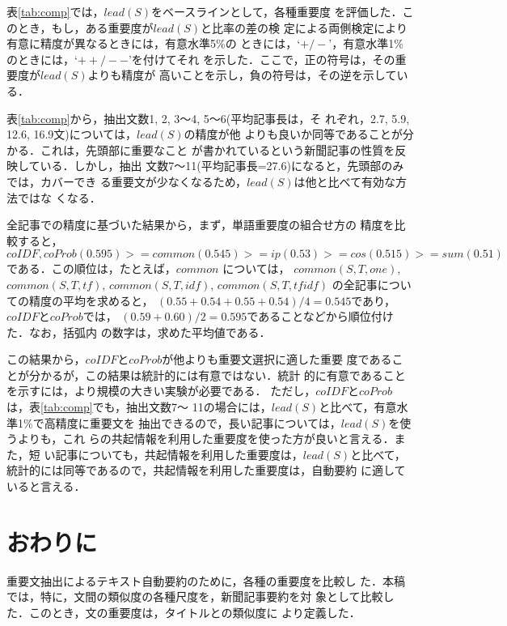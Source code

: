 表\ref{tab:comp}では，$lead(S)$をベースラインとして，各種重要度
を評価した．このとき，もし，ある重要度が$lead(S)$と比率の差の検
定による両側検定により有意に精度が異なるときには，有意水準5\%の
ときには，`$+/-$'，有意水準1\%のときには，`$++/--$'を付けてそれ
を示した．ここで，正の符号は，その重要度が$lead(S)$よりも精度が
高いことを示し，負の符号は，その逆を示している．

表\ref{tab:comp}から，抽出文数1, 2, 3〜4, 5〜6(平均記事長は，そ
れぞれ，2.7, 5.9, 12.6, 16.9文)については，$lead(S)$の精度が他
よりも良いか同等であることが分かる．これは，先頭部に重要なこと
が書かれているという新聞記事の性質を反映している．しかし，抽出
文数7〜11(平均記事長=27.6)になると，先頭部のみでは，カバーでき
る重要文が少なくなるため，$lead(S)$は他と比べて有効な方法ではな
くなる．

全記事での精度に基づいた結果から，まず，単語重要度の組合せ方の
精度を比較すると，
\begin{equation}
  \label{eq:comp1}
  coIDF,coProb (0.595) >= common (0.545) >= ip (0.53) >= cos (0.515) >= sum (0.51)
\end{equation}
である．この順位は，たとえば，$common$ については，
$common(S,T,one)$, $common(S,T,tf)$, $common(S,T,idf)$,
$common(S,T,tfidf)$ の全記事についての精度の平均を求めると，
$(0.55+0.54+0.55+0.54)/4=0.545$であり，$coIDF$と$coProb$では，
$(0.59+0.60)/2=0.595$であることなどから順位付けた．なお，括弧内
の数字は，求めた平均値である．

この結果から，$coIDF$と$coProb$が他よりも重要文選択に適した重要
度であることが分かるが，この結果は統計的には有意ではない．統計
的に有意であることを示すには，より規模の大きい実験が必要である．
ただし，$coIDF$と$coProb$は，表\ref{tab:comp}でも，抽出文数7〜
11の場合には，$lead(S)$と比べて，有意水準1\%で高精度に重要文を
抽出できるので，長い記事については，$lead(S)$を使うよりも，これ
らの共起情報を利用した重要度を使った方が良いと言える．また，短
い記事についても，共起情報を利用した重要度は，$lead(S)$と比べて，
統計的には同等であるので，共起情報を利用した重要度は，自動要約
に適していると言える．



\section{おわりに}
\label{sec:conclusion}

重要文抽出によるテキスト自動要約のために，各種の重要度を比較し
た．本稿では，特に，文間の類似度の各種尺度を，新聞記事要約を対
象として比較した．このとき，文の重要度は，タイトルとの類似度に
より定義した．

